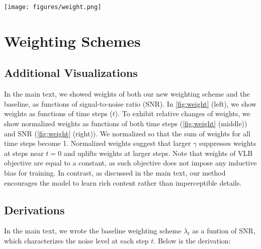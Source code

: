 \clearpage
\newpage

\twocolumn[
]

\setcounter{section}{0}
\renewcommand\thesection{\Alph{section}}
\setcounter{table}{0}
\renewcommand{\thetable}{\Alph{table}}
\setcounter{figure}{0}
\renewcommand{\thefigure}{\Alph{figure}}
\setcounter{equation}{0}
\renewcommand{\theequation}{\Alph{equation}}


\begin{figure*}[t!]
  \centering
  \texttt{[image: figures/weight.png]}
  \caption{Unnormalized or normalized weights as functions of diffusion steps or signal-to-noise ratio (SNR). Large $t$ and small SNR indicates noisy image $x_t$ near random noise $x_T$, whereas small $t$ and large SNR indicates $x_t$ near a clean image $x_0$.}
  \vspace{6.5em}
  \label{fig:weight}
\end{figure*}

\section{Weighting Schemes}
\subsection{Additional Visualizations}
In the main text, we showed weights of both our new weighting scheme and the baseline, as functions of signal-to-noise ratio (SNR). In \cref{fig:weight} (left), we show weights as functions of time steps ($t$). To exhibit relative changes of weights, we show normalized weights as functions of both time steps (\cref{fig:weight} (middle)) and SNR (\cref{fig:weight} (right)). We normalized so that the sum of weights for all time steps become 1. Normalized weights suggest that larger $\gamma$ suppresses weights at steps near $t=0$ and uplifts weights at larger steps. Note that weights of VLB objective are equal to a constant, as such objective does not impose any inductive bias for training. In contrast, as discussed in the main text, our method encourages the model to learn rich content rather than imperceptible details.




\subsection{Derivations}
In the main text, we wrote the baseline weighting scheme $\lambda_t$ as a funtion of SNR, which characterizes the noise level at each step $t$. Below is the derivation:

